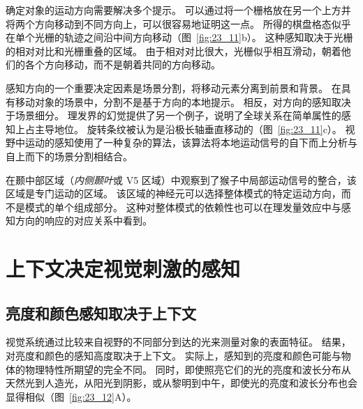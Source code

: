 确定对象的运动方向需要解决多个提示。
可以通过将一个栅格放在另一个上方并将两个方向移动到不同方向上，可以很容易地证明这一点。
所得的棋盘格态似乎在单个光栅的轨迹之间沿中间方向移动（图~\ref{fig:23_11}b）。
这种感知取决于光栅的相对对比和光栅重叠的区域。
由于相对对比很大，光栅似乎相互滑动，朝着他们的各个方向移动，而不是朝着共同的方向移动。


感知方向的一个重要决定因素是场景分割，将移动元素分离到前景和背景。
在具有移动对象的场景中，分割不是基于方向的本地提示。
相反，对方向的感知取决于场景细分。
理发界的幻觉提供了另一个例子，说明了全球关系在简单属性的感知上占主导地位。
旋转条纹被认为是沿极长轴垂直移动的（图~\ref{fig:23_11}c）。
视野中运动的感知使用了一种复杂的算法，该算法将本地运动信号的自下而上分析与自上而下的场景分割相结合。


在颞中部区域（\textit{内侧颞叶}或 V5 区域）中观察到了猴子中局部运动信号的整合，该区域是专门运动的区域。
该区域的神经元可以选择整体模式的特定运动方向，而不是模式的单个组成部分。
这种对整体模式的依赖性也可以在理发量效应中与感知方向的响应的对应关系中看到。



\section{上下文决定视觉刺激的感知}

\subsection{亮度和颜色感知取决于上下文}

视觉系统通过比较来自视野的不同部分到达的光来测量对象的表面特征。
结果，对亮度和颜色的感知高度取决于上下文。
实际上，感知到的亮度和颜色可能与物体的物理特性所期望的完全不同。
同时，即使照亮它们的光的亮度和波长分布从天然光到人造光，从阳光到阴影，或从黎明到中午，即使光的亮度和波长分布也会显得相似（图~\ref{fig:23_12}A）。


